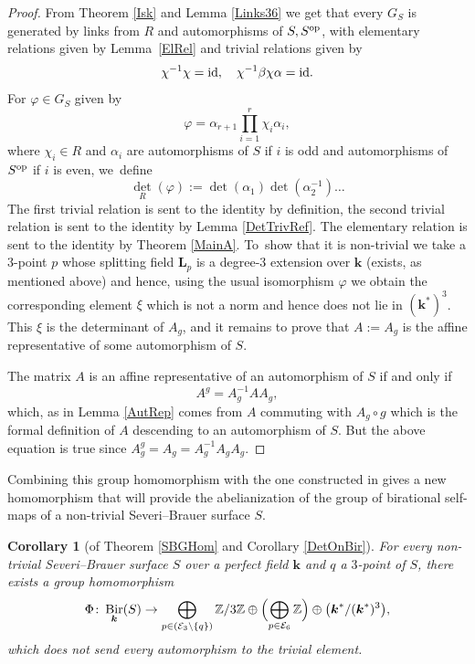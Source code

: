 \documentclass[JEP,XML,SOM,Unicode,NoFloatCountersInSection, NoEqCountersInSection,published]{cedram}
\newcommand{\id}{\textup{id}}
\newcommand{\op}{\textup{op}}
\newtheorem{corollary}[theorem]{Corollary}
\theoremstyle{definition}
\newcommand{\kk}{{\boldsymbol{k}}}
\newcommand{\LL}{{\boldsymbol{L}}}
\DeclareMathOperator{\Bir}{Bir}
\begin{document}
\begin{proof}
From Theorem \ref{Isk} and Lemma \ref{Links36} we get that every $G_S$ is generated by links from $R$ and automorphisms of $S,S^{\op}$, with elementary relations given by Lemma~\ref{ElRel} and trivial relations given by
\[
\chi^{-1} \chi = \id, \quad\chi^{-1} \beta \chi \alpha = \id.
\]
For $\varphi \in G_S$ given by
\[
\varphi = \alpha_{r+1}\prod_{i=1}^r\chi_i \alpha_i,
\]
where $\chi_i \in R$ and $\alpha_i$ are automorphisms of $S$ if $i$ is odd and automorphisms of $S^{\op}$ if $i$ is even, we~define
\[
\det_R(\varphi) := \det(\alpha_1) \det(\alpha_2^{-1}) \dots
\]
The first trivial relation is sent to the identity by definition, the second trivial relation is sent to the identity by Lemma \ref{DetTrivRef}. The elementary relation is sent to the identity by Theorem \ref{MainA}. To~show that it is non-trivial we take a $3$\nobreakdash-point $p$ whose splitting field $\LL_p$ is a degree-$3$ extension over $\kk$ (exists, as mentioned above) and hence, using the usual isomorphism $\varphi$ we obtain the corresponding element $\xi$ which is not a norm and hence does not lie in $(\kk^*)^3$. This $\xi$ is the determinant of $A_g$, and it remains to prove that $A := A_g$ is the affine representative of some automorphism of $S$.

The matrix $A$ is an affine representative of an automorphism of $S$ if and only if
\[
A^g = A_g^{-1} A A_g,
\]
which, as in Lemma \ref{AutRep} comes from $A$ commuting with $A_g \circ g$ which is the formal definition of $A$ descending to an automorphism of $S$. But the above equation is true since $A_g^g = A_g = A_g^{-1}A_g A_g$.
\end{proof}

Combining this group homomorphism with the one constructed in \cite{BSY} gives a new homomorphism that will provide the abelianization of the group of birational self-maps of a non-trivial Severi--Brauer surface $S$.
\begin{corollary}[of Theorem \ref{SBGHom} and Corollary \ref{DetOnBir}] \label{AbMap}
For every non-trivial Severi--Brauer surface $S$ over a perfect field $\kk$ and $q$ a $3$\nobreakdash-point of $S$, there exists a group homomorphism
\[
\Phi \colon \Bir_{\kk}(S) \to \bigoplus_{p \in (\mathcal{E}_3 \setminus \{ q \})} \mathbb{Z}/3\mathbb{Z} \oplus \Bigl(\bigoplus_{p \in \mathcal{E}_6} \mathbb{Z}\Bigr) \oplus \bigl(\kk^* / (\kk^*)^3\bigr),
\]
which does not send every automorphism to the trivial element.
\end{corollary}
\end{document}
